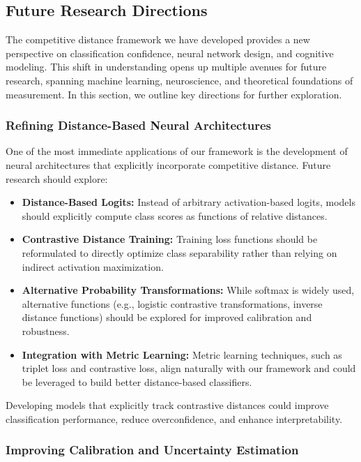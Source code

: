 \subsection{Future Research Directions}

The competitive distance framework we have developed provides a new perspective on classification confidence, neural network design, and cognitive modeling. This shift in understanding opens up multiple avenues for future research, spanning machine learning, neuroscience, and theoretical foundations of measurement. In this section, we outline key directions for further exploration.

\subsubsection{Refining Distance-Based Neural Architectures}

One of the most immediate applications of our framework is the development of neural architectures that explicitly incorporate competitive distance. Future research should explore:

\begin{itemize}
    \item \textbf{Distance-Based Logits:} Instead of arbitrary activation-based logits, models should explicitly compute class scores as functions of relative distances.
    \item \textbf{Contrastive Distance Training:} Training loss functions should be reformulated to directly optimize class separability rather than relying on indirect activation maximization.
    \item \textbf{Alternative Probability Transformations:} While softmax is widely used, alternative functions (e.g., logistic contrastive transformations, inverse distance functions) should be explored for improved calibration and robustness.
    \item \textbf{Integration with Metric Learning:} Metric learning techniques, such as triplet loss and contrastive loss, align naturally with our framework and could be leveraged to build better distance-based classifiers.
\end{itemize}

Developing models that explicitly track contrastive distances could improve classification performance, reduce overconfidence, and enhance interpretability.

\subsubsection{Improving Calibration and Uncertainty Estimation}

